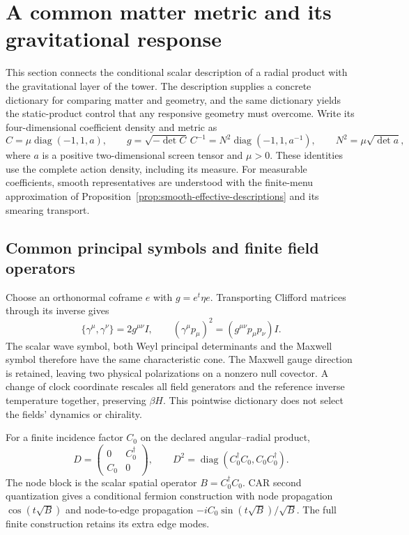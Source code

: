 \section{A common matter metric and its gravitational response}
\label{sec:common-matter-metric-response}

This section connects the conditional scalar description of a radial
product with the gravitational layer of the tower. The description supplies
a concrete dictionary for comparing matter and geometry, and the same
dictionary yields the static-product control that any responsive geometry
must overcome. Write its four-dimensional coefficient density and metric as
\[
 C=\mu\operatorname{diag}(-1,1,a),\qquad
 g=\sqrt{-\det C}\,C^{-1}
   =N^2\operatorname{diag}(-1,1,a^{-1}),\qquad
 N^2=\mu\sqrt{\det a},
\]
where \(a\) is a positive two-dimensional screen tensor and \(\mu>0\).
These identities use the complete action density, including its measure.
For measurable coefficients, smooth representatives are understood with the
finite-menu approximation of
Proposition~\ref{prop:smooth-effective-descriptions} and its smearing
transport.

\subsection{Common principal symbols and finite field operators}

Choose an orthonormal coframe \(e\) with \(g=e^t\eta e\). Transporting
Clifford matrices through its inverse gives
\[
 \{\gamma^\mu,\gamma^\nu\}=2g^{\mu\nu}I,\qquad
 (\gamma^\mu p_\mu)^2=(g^{\mu\nu}p_\mu p_\nu)I.
\]
The scalar wave symbol, both Weyl principal determinants and the Maxwell
symbol therefore have the same characteristic cone. The Maxwell gauge
direction is retained, leaving two physical polarizations on a nonzero
null covector. A change of clock coordinate rescales all field generators
and the reference inverse temperature together, preserving \(\beta H\).
This pointwise dictionary does not select the fields' dynamics or chirality.

For a finite incidence factor \(C_0\) on the declared angular--radial product,
\[
 D=\begin{pmatrix}0&C_0^\dagger\\C_0&0\end{pmatrix},\qquad
 D^2=\operatorname{diag}(C_0^\dagger C_0,C_0C_0^\dagger).
\]
The node block is the scalar spatial operator \(B=C_0^\dagger C_0\).
CAR second quantization gives a conditional fermion construction with node
propagation \(\cos(t\sqrt B)\) and node-to-edge propagation
\(-iC_0\sin(t\sqrt B)/\sqrt B\). The full finite construction retains its
extra edge modes.

